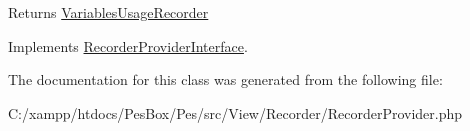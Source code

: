 \begin{DoxyReturn}{Returns}
\mbox{\hyperlink{class_pes_1_1_view_1_1_recorder_1_1_variables_usage_recorder}{Variables\+Usage\+Recorder}} 
\end{DoxyReturn}


Implements \mbox{\hyperlink{interface_pes_1_1_view_1_1_recorder_1_1_recorder_provider_interface_a3a845b7c3190054b0443ad6d53022756}{Recorder\+Provider\+Interface}}.



The documentation for this class was generated from the following file\+:\begin{DoxyCompactItemize}
\item 
C\+:/xampp/htdocs/\+Pes\+Box/\+Pes/src/\+View/\+Recorder/Recorder\+Provider.\+php\end{DoxyCompactItemize}
